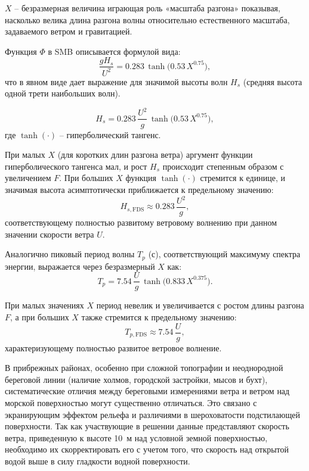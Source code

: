 $X$ -- безразмерная величина играющая роль «масштаба разгона» показывая, насколько велика длина разгона волны относительно естественного масштаба, задаваемого ветром и гравитацией.
  
Функция $\Phi$ в SMB описывается формулой вида: 
\begin{equation}
    \frac{g H_s}{U^2} = 0.283\,\tanh\!\bigl(0.53\,X^{0.75}\bigr),
\end{equation}
что в явном виде дает выражение для значимой высоты волн $H_s$ (средняя высота одной трети наибольших волн).

\begin{equation}
    H_s = 0.283\,\frac{U^2}{g}\, \tanh\!\bigl(0.53\,X^{0.75}\bigr),\label{eq:smb_hs}
\end{equation}
где $\tanh(\cdot)$ -- гиперболический тангенс. 

При малых $X$ (для коротких длин разгона ветра) аргумент функции гиперболического тангенса мал, и рост $H_s$ происходит степенным образом с увеличением $F$. 
При больших $X$ функция $\tanh(\cdot)$ стремится к единице, и значимая высота асимптотически приближается к предельному значению:
\begin{equation}
    H_{s,\mathrm{FDS}} \approx 0.283\,\frac{U^2}{g},\label{eq:smb_hs_approx}
\end{equation}
соответствующему полностью развитому ветровому волнению при данном значении скорости ветра $U$.

Аналогично пиковый период волны $T_p$ (с), соответствующий максимуму спектра энергии, выражается через безразмерный $X$ как:
\begin{equation}
    T_p = 7.54\,\frac{U}{g}\, \tanh\!\bigl(0.833\,X^{0.375}\bigr).\label{eq:smb_tp}
\end{equation}

При малых значениях $X$ период невелик и увеличивается с ростом длины разгона $F$, а при больших $X$ также стремится к предельному значению: 
\begin{equation}
    T_{p,\mathrm{FDS}} \approx 7.54\,\frac{U}{g},\label{eq:smb_tp_approx}
\end{equation}
характеризующему полностью развитое ветровое волнение. 

В прибрежных районах, особенно при сложной топографии и неоднородной береговой линии (наличие холмов, городской застройки, мысов и бухт), систематические отличия между береговыми измерениями ветра и ветром над морской поверхностью могут существенно отличаться. 
Это связано с экранирующим эффектом рельефа и различиями в шероховатости подстилающей поверхности. 
Так как участвующие в решении данные представляют скорость ветра, приведенную к высоте 10~м над условной земной поверхностью, необходимо их скорректировать его с учетом того, что скорость над открытой водой выше в силу гладкости водной поверхности.

